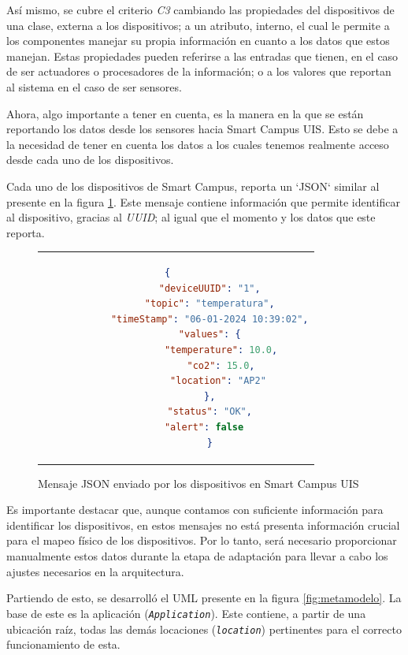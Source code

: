 Así mismo, se cubre el criterio \textit{C3} cambiando las propiedades del dispositivos de una clase, externa a los dispositivos; a un atributo, interno, el cual le permite a los componentes manejar su propia información en cuanto a los datos que estos manejan. Estas propiedades pueden referirse a las entradas que tienen, en el caso de ser actuadores o procesadores de la información; o a los valores que reportan al sistema en el caso de ser sensores.

Ahora, algo importante a tener en cuenta, es la manera en la que se están reportando los datos desde los sensores hacia Smart Campus UIS. Esto se debe a la necesidad de tener en cuenta los datos a los cuales tenemos realmente acceso desde cada uno de los dispositivos.

Cada uno de los dispositivos de Smart Campus, reporta un `JSON` similar al presente en la figura \ref{fig:jsonSCU}. Este mensaje contiene información que permite identificar al dispositivo, gracias al \textit{UUID}; al igual que el momento y los datos que este reporta.

\begin{figure}[H]
    \centering
    \caption{Mensaje JSON enviado por los dispositivos en Smart Campus UIS }
    \cite{SmartCampusGithub}
    \label{fig:jsonSCU}
    \begin{tabular}{c}
        \setstretch{1}
        \small
        \begin{lstlisting}[language=Json]
            {   
            "deviceUUID": "1",
            "topic": "temperatura",
            "timeStamp": "06-01-2024 10:39:02",
            "values": {
                "temperature": 10.0,
                "co2": 15.0,
                "location": "AP2" 
            },
            "status": "OK",
            "alert": false  
            }
        \end{lstlisting}
    \end{tabular}
\end{figure}

Es importante destacar que, aunque contamos con suficiente información para identificar los dispositivos, en estos mensajes no está presenta información crucial para el mapeo físico de los dispositivos. Por lo tanto, será necesario proporcionar manualmente estos datos durante la etapa de adaptación para llevar a cabo los ajustes necesarios en la arquitectura.

Partiendo de esto, se desarrolló el UML presente en la figura \ref{fig:metamodelo}. La base de este es la aplicación (\textit{\texttt{Application}}). Este contiene, a partir de una ubicación raíz, todas las demás locaciones (\textit{\texttt{location}}) pertinentes para el correcto funcionamiento de esta.

